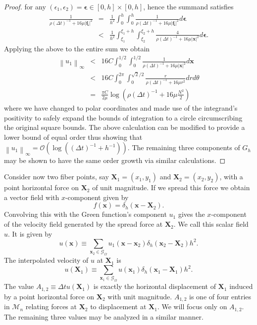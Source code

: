 \documentclass[preprint,12pt]{elsarticle}
\newcommand{\norm}[1]{\left\lVert#1\right\rVert}
\begin{document}
\begin{proof}
for any $(\epsilon_1,\epsilon_2) = \mathbf{\epsilon} \in [0,h]\times[0,h]$, hence the summand satisfies
\begin{eqnarray}
\frac{1}{\rho(\Delta t)^{-1}+16\mu|\mathbf{\xi}|^2}
&=&
\frac{1}{h^2}\int_0^h\int_0^h
\frac{1}{\rho(\Delta t)^{-1}+16\mu|\mathbf{\xi}|^2}
d\mathbf{\epsilon} \\
&<&
\frac{1}{h^2}\int_{\xi_1}^{\xi_1+h}\int_{\xi_2}^{\xi_2+h}
\frac{4}{\rho(\Delta t)^{-1}+16\mu|\mathbf{x}|^2}
d\mathbf{\epsilon}.
\end{eqnarray}
Applying the above to the entire sum we obtain
\begin{eqnarray}
\norm{u_1}_\infty
&<&
16C\int_0^{1/2}\int_0^{1/2}
\frac{1}{\rho(\Delta t)^{-1}+16\mu|\mathbf{x}|^2}
d\mathbf{x} \\
&<&
16C\int_0^{2\pi}\int_0^{\sqrt{2}/2}
\frac{r}{\rho(\Delta t)^{-1}+16\mu r^2}
drd\theta \\
&=&
\frac{\pi C}{2\mu} \log\left(\rho(\Delta t)^{-1}+16\mu \frac{N^2}{2}\right)
\end{eqnarray}
where we have changed to polar coordinates and made use of the integrand's positivity to safely expand the bounds of integration to a circle circumscribing the original square bounds. The above calculation can be modified to provide a lower bound of equal order thus showing that $\norm{u_1}_\infty = \mathcal{O}(\log((\Delta t)^{-1} + h^{-1}))$.
The remaining three components of $G_h$ may be shown to have the same order growth via similar calculations.
\end{proof}


Consider now two fiber points, say $\mathbf{X}_1=(x_1,y_1)$ and $\mathbf{X}_2=(x_2,y_2)$, with a point horizontal force on $\mathbf{X}_2$ of unit magnitude. If we spread this force we obtain a vector field with $x$-component given by
\begin{equation}
f(\mathbf{x}) = \delta_h(\mathbf{x} - \mathbf{X}_2).
\end{equation}
Convolving this with the Green function's component $u_1$ gives the $x$-component of the velocity field generated by the spread force at $\mathbf{X}_2$. We call this scalar field $u$. It is given by
\begin{equation}
u(\mathbf{x}) \equiv
\sum_{\mathbf{x}_2\in\mathcal{G}_\Omega}
u_1(\mathbf{x}-\mathbf{x}_2)\delta_h(\mathbf{x}_2-\mathbf{X}_2)h^2.
\end{equation}
The interpolated velocity of $u$ at $\mathbf{X}_1$ is
\begin{equation}
u(\mathbf{X}_1) \equiv
\sum_{\mathbf{x}_1\in\mathcal{G}_\Omega}
u(\mathbf{x}_1)\delta_h(\mathbf{x}_1 - \mathbf{X}_1)h^2.
\end{equation}
The value $A_{1,2} \equiv \Delta t u(\mathbf{X}_1)$ is exactly the horizontal displacement of $\mathbf{X}_1$ induced by a point horizontal force on $\mathbf{X}_2$ with unit magnitude. $A_{1,2}$ is one of four entries in $\mathcal{M}_n$ relating forces at $\mathbf{X}_2$ to displacement at $\mathbf{X}_1$. We will focus only on $A_{1,2}$. The remaining three values may be analyzed in a similar manner.
\end{document}
